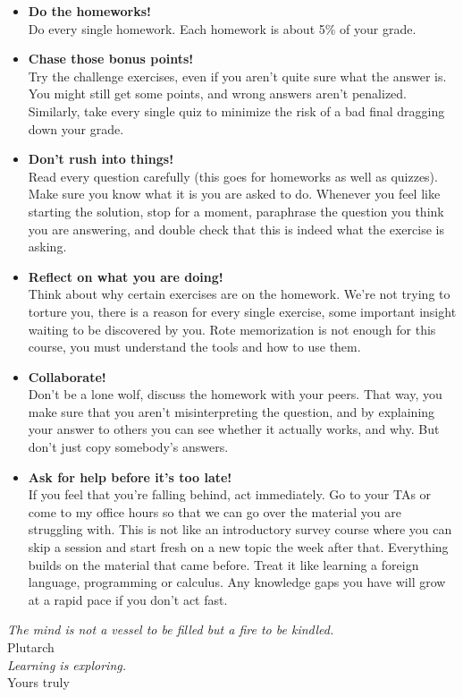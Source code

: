 \begin{itemize}
    \item \textbf{Do the homeworks!}\\
        Do every single homework.
        Each homework is about 5\% of your grade.
    \item \textbf{Chase those bonus points!}\\
        Try the challenge exercises, even if you aren't quite sure what the answer is.
        You might still get some points, and wrong answers aren't penalized.
        Similarly, take every single quiz to minimize the risk of a bad final dragging down your grade.
    \item \textbf{Don't rush into things!}\\
        Read every question carefully (this goes for homeworks as well as quizzes).
        Make sure you know what it is you are asked to do.
        Whenever you feel like starting the solution, stop for a moment, paraphrase the question you think you are answering, and double check that this is indeed what the exercise is asking.
    \item \textbf{Reflect on what you are doing!}\\
        Think about why certain exercises are on the homework.
        We're not trying to torture you, there is a reason for every single exercise, some important insight waiting to be discovered by you.
        Rote memorization is not enough for this course, you must understand the tools and how to use them.
    \item \textbf{Collaborate!}\\
        Don't be a lone wolf, discuss the homework with your peers.
        That way, you make sure that you aren't misinterpreting the question, and by explaining your answer to others you can see whether it actually works, and why.
        But don't just copy somebody's answers.
    \item \textbf{Ask for help before it's too late!}\\
        If you feel that you're falling behind, act immediately.
        Go to your TAs or come to my office hours so that we can go over the material you are struggling with.
        This is not like an introductory survey course where you can skip a session and start fresh on a new topic the week after that.
        Everything builds on the material that came before.
        Treat it like learning a foreign language, programming or calculus.
        Any knowledge gaps you have will grow at a rapid pace if you don't act fast.
\end{itemize}

\medskip
\begin{flushright}
    \begin{minipage}[b]{28em}
        \flushright
        \emph{The mind is not a vessel to be filled but a fire to be kindled.}\\
        Plutarch\\

        \medskip
        \emph{Learning is exploring.}\\
        Yours truly
    \end{minipage}
\end{flushright}
